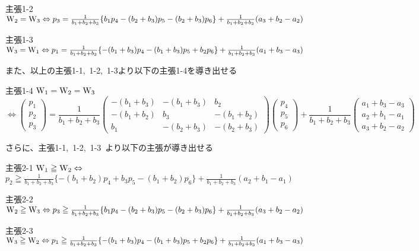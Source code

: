 \documentclass[11pt]{jarticle} %
\begin{document}
\vspace{5mm}

\begin{itembox}[l]{主張1-2}
${\rm W_{2}}={\rm W_{3}}\Leftrightarrow p_3=\frac{1}{b_1+b_2+b_3}\{b_1p_4-(b_2+b_3)p_5-(b_2+b_3)p_6\}+\frac{1}{b_1+b_2+b_3}(a_3+b_2-a_2)$
\end{itembox}
\begin{itembox}[l]{主張1-3}
${\rm W_{3}}={\rm W_{1}}\Leftrightarrow p_1=\frac{1}{b_1+b_2+b_3}\{-(b_1+b_3)p_4-(b_1+b_3)p_5+b_2p_6\}+\frac{1}{b_1+b_2+b_3}(a_1+b_3-a_3)$
\end{itembox}

また、以上の主張1-1,~1-2,~1-3より以下の主張1-4を導き出せる

\begin{itembox}[l]{主張1-4}
${\rm W_{1}}={\rm W_{2}}={\rm W_{3}} $
{\scriptsize \[\Leftrightarrow
\left(
\begin{array}{c}
p_1 \\
p_2 \\
p_3
\end{array}
\right)
=
\frac{1}{b_1+b_2+b_3}
\left(
\begin{array}{ccc}
-(b_1+b_3) & -(b_1+b_3) & b_2 \\
-(b_1+b_2) & b_3 & -(b_1+b_2) \\
b_1 & -(b_2+b_3) & -(b_2+b_3)
\end{array}
\right)
\left(
\begin{array}{c}
p_4 \\
p_5 \\
p_6
\end{array}
\right)
+
\frac{1}{b_1+b_2+b_3}
\left(
\begin{array}{c}
a_1+b_3-a_3 \\
a_2+b_1-a_1 \\
a_3+b_2-a_2
\end{array}
\right)
\]}
\end{itembox}
さらに、主張1-1,~1-2,~1-3~より以下の主張が導き出せる\\

\begin{itembox}[l]{主張2-1}
${\rm W_{1}} \geqq {\rm W_{2}}\Leftrightarrow $
$p_2 \geqq \frac{1}{b_1+b_2+b_3}\{-(b_1+b_2)p_4+b_3p_5-(b_1+b_2)p_6\}+\frac{1}{b_1+b_2+b_3}(a_2+b_1-a_1)$
\end{itembox}

\begin{itembox}[l]{主張2-2}
${\rm W_{2}}\geqq{\rm W_{3}}\Leftrightarrow p_3\geqq\frac{1}{b_1+b_2+b_3}\{b_1p_4-(b_2+b_3)p_5-(b_2+b_3)p_6\}+\frac{1}{b_1+b_2+b_3}(a_3+b_2-a_2)$
\end{itembox}
\begin{itembox}[l]{主張2-3}
${\rm W_{3}}\geqq{\rm W_{2}}\Leftrightarrow p_1\geqq\frac{1}{b_1+b_2+b_3}\{-(b_1+b_3)p_4-(b_1+b_3)p_5+b_2p_6\}+\frac{1}{b_1+b_2+b_3}(a_1+b_3-a_3)$
\end{itembox}
\end{document}
